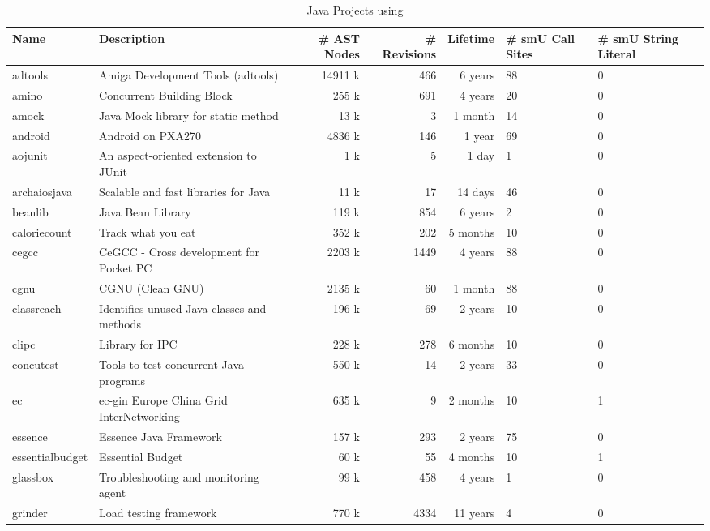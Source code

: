 \begin{table*}[htb]
\centering
\caption{Java Projects using \smu{}} 
\label{table:projects}
\begin{tabularx}{\textwidth}{|l|l|r|r|r|Y|Y|}
  \hline
Name & Description & \# AST Nodes & \# Revisions & Lifetime & \# smU Call Sites & \# smU String Literal \\ 
  \hline
adtools & Amiga Development Tools (adtools) & 14911 k & 466 & 6 years &  88 &   0 \\ 
  amino & Concurrent Building Block & 255 k & 691 & 4 years &  20 &   0 \\ 
  amock & Java Mock library for static method & 13 k &   3 & 1 month &  14 &   0 \\ 
  android & Android on PXA270 & 4836 k & 146 & 1 year &  69 &   0 \\ 
  aojunit & An aspect-oriented extension to JUnit & 1 k &   5 & 1 day &   1 &   0 \\ 
  archaiosjava & Scalable and fast libraries for Java & 11 k &  17 & 14 days &  46 &   0 \\ 
  beanlib & Java Bean Library & 119 k & 854 & 6 years &   2 &   0 \\ 
  caloriecount & Track what you eat & 352 k & 202 & 5 months &  10 &   0 \\ 
  cegcc & CeGCC - Cross development for Pocket PC & 2203 k & 1449 & 4 years &  88 &   0 \\ 
  cgnu & CGNU (Clean GNU) & 2135 k &  60 & 1 month &  88 &   0 \\ 
  classreach & Identifies unused Java classes and methods & 196 k &  69 & 2 years &  10 &   0 \\ 
  clipc & Library for IPC & 228 k & 278 & 6 months &  10 &   0 \\ 
  concutest & Tools to test concurrent Java programs & 550 k &  14 & 2 years &  33 &   0 \\ 
  ec & ec-gin Europe China Grid InterNetworking & 635 k &   9 & 2 months &  10 &   1 \\ 
  essence & Essence Java Framework & 157 k & 293 & 2 years &  75 &   0 \\ 
  essentialbudget & Essential Budget & 60 k &  55 & 4 months &  10 &   1 \\ 
  glassbox & Troubleshooting and monitoring agent & 99 k & 458 & 4 years &   1 &   0 \\ 
  grinder & Load testing framework & 770 k & 4334 & 11 years &   4 &   0 \\ 

\end{tabularx}
\end{table*}
